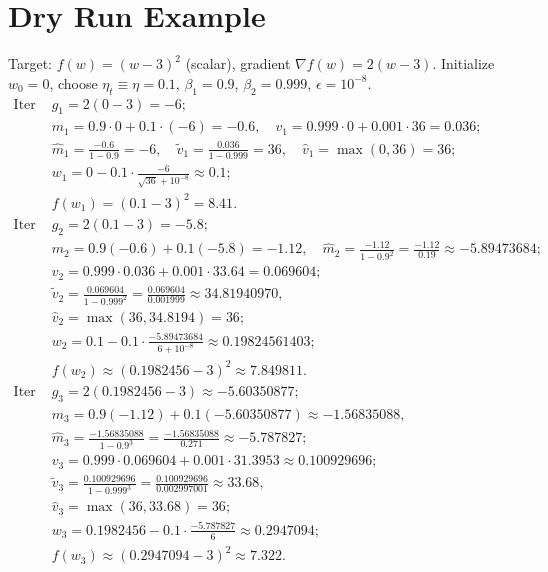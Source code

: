 \documentclass[11pt]{article}
\begin{document}
\section*{Dry Run Example}
Target: $f(w)=(w-3)^2$ (scalar), gradient $\nabla f(w)=2(w-3)$.
Initialize $w_0=0$, choose $\eta_t\equiv \eta=0.1$, $\beta_1=0.9$, $\beta_2=0.999$, $\epsilon=10^{-8}$.
\[
\begin{aligned}
\text{Iter 1: }& g_1=2(0-3)=-6;\\
& m_1=0.9\cdot 0+0.1\cdot(-6)=-0.6,\quad v_1=0.999\cdot 0+0.001\cdot 36=0.036;\\
& \hat m_1 = \frac{-0.6}{1-0.9}=-6,\quad \tilde v_1=\frac{0.036}{1-0.999}=36,\quad \hat v_1=\max(0,36)=36;\\
& w_1 = 0 - 0.1 \cdot \frac{-6}{\sqrt{36}+10^{-8}} \approx 0.1;\\
& f(w_1)=(0.1-3)^2=8.41.\\[0.5em]
\text{Iter 2: }& g_2=2(0.1-3)=-5.8;\\
& m_2=0.9(-0.6)+0.1(-5.8)=-1.12,\quad \hat m_2=\frac{-1.12}{1-0.9^2}=\frac{-1.12}{0.19}\approx -5.89473684;\\
& v_2=0.999\cdot 0.036 + 0.001 \cdot 33.64=0.069604;\\
& \tilde v_2=\frac{0.069604}{1-0.999^2}=\frac{0.069604}{0.001999}\approx 34.81940970,\\
& \hat v_2=\max(36,34.8194)=36;\\
& w_2 = 0.1 - 0.1 \cdot \frac{-5.89473684}{6+10^{-8}} \approx 0.19824561403;\\
& f(w_2) \approx (0.1982456-3)^2 \approx 7.849811.\\[0.5em]
\text{Iter 3: }& g_3=2(0.1982456-3) \approx -5.60350877;\\
& m_3=0.9(-1.12)+0.1(-5.60350877)\approx -1.56835088,\\
& \hat m_3=\frac{-1.56835088}{1-0.9^3}=\frac{-1.56835088}{0.271}\approx -5.787827;\\
& v_3=0.999\cdot 0.069604 + 0.001 \cdot 31.3953 \approx 0.100929696;\\
& \tilde v_3 = \frac{0.100929696}{1-0.999^3}=\frac{0.100929696}{0.002997001}\approx 33.68,\\
& \hat v_3=\max(36,33.68)=36;\\
& w_3 = 0.1982456 - 0.1 \cdot \frac{-5.787827}{6} \approx 0.2947094;\\
& f(w_3) \approx (0.2947094-3)^2 \approx 7.322.
\end{aligned}
\]
\end{document}
